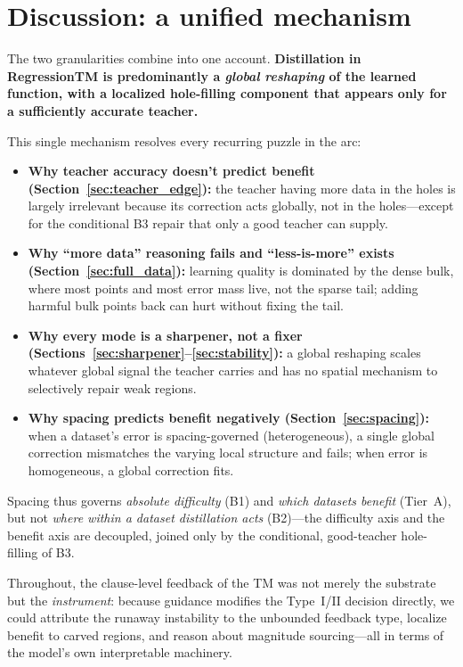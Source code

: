 \section{Discussion: a unified mechanism}
\label{sec:discussion}

The two granularities combine into one account. \textbf{Distillation in RegressionTM is
predominantly a \emph{global reshaping} of the learned function, with a localized
hole-filling component that appears only for a sufficiently accurate teacher.}

This single mechanism resolves every recurring puzzle in the arc:

\begin{itemize}
  \item \textbf{Why teacher accuracy doesn't predict benefit
    (Section~\ref{sec:teacher_edge}):} the teacher having more data in the holes is
    largely irrelevant because its correction acts globally, not in the holes---except for
    the conditional B3 repair that only a good teacher can supply.
  \item \textbf{Why ``more data'' reasoning fails and ``less-is-more'' exists
    (Section~\ref{sec:full_data}):} learning quality is dominated by the dense bulk, where
    most points and most error mass live, not the sparse tail; adding harmful bulk points
    back can hurt without fixing the tail.
  \item \textbf{Why every mode is a sharpener, not a fixer
    (Sections~\ref{sec:sharpener}--\ref{sec:stability}):} a global reshaping scales
    whatever global signal the teacher carries and has no spatial mechanism to selectively
    repair weak regions.
  \item \textbf{Why spacing predicts benefit negatively
    (Section~\ref{sec:spacing}):} when a dataset's error is spacing-governed
    (heterogeneous), a single global correction mismatches the varying local structure and
    fails; when error is homogeneous, a global correction fits.
\end{itemize}

Spacing thus governs \emph{absolute difficulty} (B1) and \emph{which datasets benefit}
(Tier~A), but not \emph{where within a dataset distillation acts} (B2)---the difficulty
axis and the benefit axis are decoupled, joined only by the conditional, good-teacher
hole-filling of B3.

Throughout, the clause-level feedback of the TM was not merely the substrate but the
\emph{instrument}: because guidance modifies the Type~I/II decision directly, we could
attribute the runaway instability to the unbounded feedback type, localize benefit to
carved regions, and reason about magnitude sourcing---all in terms of the model's own
interpretable machinery.
